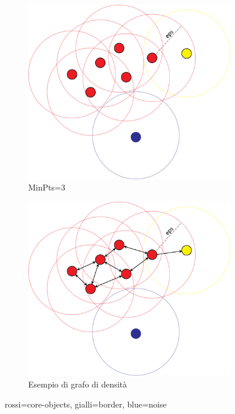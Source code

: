 \documentclass[a4paper,12pt]{report}
\begin{document}
\begin{figure}
    \centering
    \begin{subfigure}[b]{0.45\textwidth}
        \centering
        \includegraphics[width=\textwidth]{dbscanWithoutPaths}
       	\caption{ MinPts=3}
         \label{fig:densityConnectedObjects}
         
    \end{subfigure}
    \hfill
    \begin{subfigure}[b]{0.45\textwidth}
        \centering
        \includegraphics[width=\textwidth]{dbscanPaths}
        \caption{Esempio di grafo di densità}
         \label{fig:graphdensityConnectedObjects}
    \end{subfigure}
    \hfill
    \caption{rossi=core-objects, gialli=border,
    	blue=noise}
    \label{fig:dbscangraph}
\end{figure} 
\end{document}
